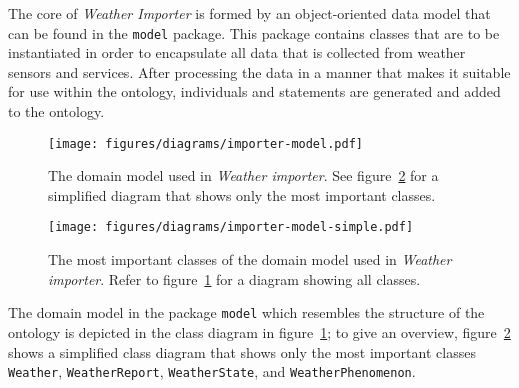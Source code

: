 The core of \emph{Weather Importer} is formed by an object-oriented data model that can be found in the \texttt{model} package. This package contains classes that are to be instantiated in order to encapsulate all data that is collected from weather sensors and services. After processing the data in a manner that makes it suitable for use within the \smarthomeweather ontology, individuals and statements are generated and added to the ontology.

\begin{figure}
\centering
\texttt{[image: figures/diagrams/importer-model.pdf]}
\caption{The domain model used in \emph{Weather importer}. See figure~\ref{fig:importer_model2} for a simplified diagram that shows only the most important classes.}
\label{fig:importer_model1}
\end{figure}

\begin{figure}
\centering
\texttt{[image: figures/diagrams/importer-model-simple.pdf]}
\caption{The most important classes of the domain model used in \emph{Weather importer}. Refer to figure~\ref{fig:importer_model1} for a diagram showing all classes.}
\label{fig:importer_model2}
\end{figure}

The domain model in the package \texttt{model} which resembles the structure of the \smarthomeweather ontology is depicted in the  class diagram in figure~\ref{fig:importer_model1}; to give an overview, figure~\ref{fig:importer_model2} shows a simplified class diagram that shows only the most important classes \texttt{Weather}, \texttt{WeatherReport}, \texttt{WeatherState}, and \texttt{WeatherPhenomenon}.

